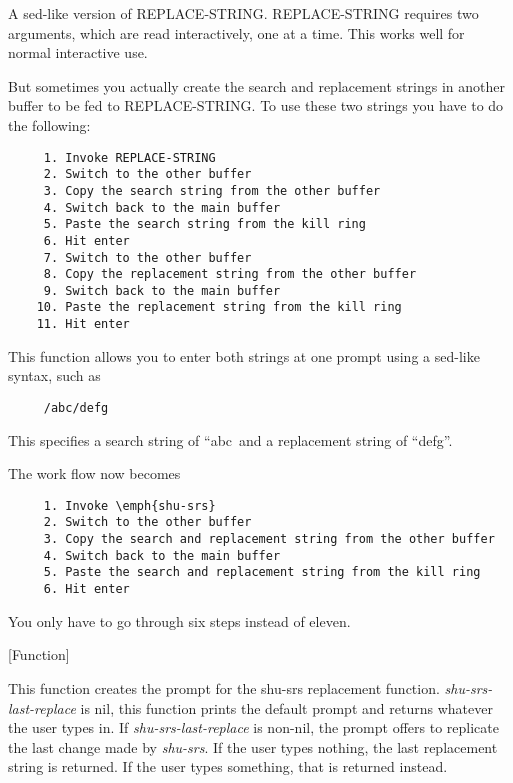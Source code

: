 \begin{doc-string}
A sed-like version of REPLACE-STRING.  REPLACE-STRING requires two arguments,
which are read interactively, one at a time.  This works well for normal
interactive use.

But sometimes you actually create the search and replacement strings in another
buffer to be fed to REPLACE-STRING.  To use these two strings you have to do the
following:

\small{\begin{verbatim}
     1. Invoke REPLACE-STRING
     2. Switch to the other buffer
     3. Copy the search string from the other buffer
     4. Switch back to the main buffer
     5. Paste the search string from the kill ring
     6. Hit enter
     7. Switch to the other buffer
     8. Copy the replacement string from the other buffer
     9. Switch back to the main buffer
    10. Paste the replacement string from the kill ring
    11. Hit enter
\end{verbatim}}

This function allows you to enter both strings at one prompt using a sed-like
syntax, such as

\small{\begin{verbatim}
     /abc/defg
\end{verbatim}}

This specifies a search string of ``abc\ and a replacement string of ``defg''.

The work flow now becomes

\small{\begin{verbatim}
     1. Invoke \emph{shu-srs}
     2. Switch to the other buffer
     3. Copy the search and replacement string from the other buffer
     4. Switch back to the main buffer
     5. Paste the search and replacement string from the kill ring
     6. Hit enter
\end{verbatim}}

You only have to go through six steps instead of eleven.
\end{doc-string}

\vspace{1em}
\noindent
{}
\usebox{\funcname}
 \hfill [Function]

\begin{doc-string}
This function creates the prompt for the shu-srs replacement function.
\emph{shu-srs-last-replace} is nil, this function prints the default prompt and returns
whatever the user types in.  If \emph{shu-srs-last-replace} is non-nil, the prompt
offers to replicate the last change made by \emph{shu-srs}.  If the user types nothing,
the last replacement string is returned.  If the user types something, that is
returned instead.
\end{doc-string}

